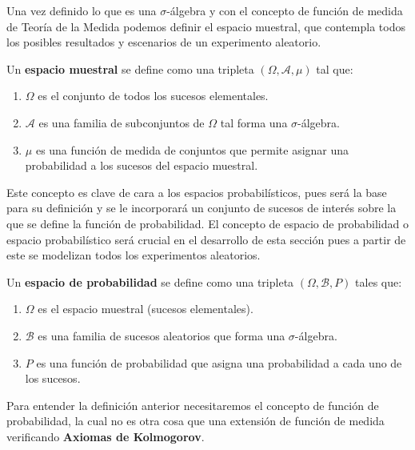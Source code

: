 Una vez definido lo que es una $\sigma$-álgebra y con el concepto de función de medida de Teoría de la Medida podemos definir el espacio muestral, que contempla todos los posibles resultados y escenarios de un experimento aleatorio.

\begin{definition}
    Un \textbf{espacio muestral} se define como una tripleta $(\Omega, \mathcal{A}, \mu)$ tal que:
    \begin{enumerate}
        \item $\Omega$ es el conjunto de todos los sucesos elementales.
        \item $\mathcal{A}$ es una familia de subconjuntos de $\Omega$ tal forma una $\sigma$-álgebra.
        \item $\mu$ es una función de medida de conjuntos que permite asignar una probabilidad a los sucesos del espacio muestral.
    \end{enumerate}
\end{definition}

Este concepto es clave de cara a los espacios probabilísticos, pues será la base para su definición y se le incorporará un conjunto de sucesos de interés sobre la que se define la función de probabilidad. El concepto de espacio de probabilidad o espacio probabilístico será crucial en el desarrollo de esta sección pues a partir de este se modelizan todos los experimentos aleatorios.

\begin{definition}
    Un \textbf{espacio de probabilidad} se define como una tripleta $(\Omega, \mathcal{B}, P)$ tales que:
    \begin{enumerate}
        \item $\Omega$ es el espacio muestral (sucesos elementales).
        \item $\mathcal{B}$ es una familia de sucesos aleatorios que forma una $\sigma$-álgebra.
        \item $P$ es una función de probabilidad que asigna una probabilidad a cada uno de los sucesos.
    \end{enumerate}
\end{definition}

Para entender la definición anterior necesitaremos el concepto de función de probabilidad, la cual no es otra cosa que una extensión de función de medida verificando \textbf{Axiomas de Kolmogorov}.

